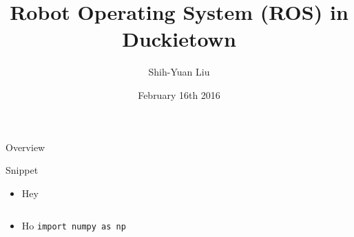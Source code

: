 \documentclass{beamer}
\author[Shih-Yuan Liu]{Shih-Yuan Liu}
\title[ROS in Duckietown]{Robot Operating System (ROS) in Duckietown}
\institute[Duckietown MIT]{Duckietown, MIT}
\date[Feb. 16th, 2016]{February 16th 2016}
\begin{document}

\begin{frame}[plain,label=titlepage,noframenumbering] %
  \titlepage
\end{frame}

\begin{frame}[label=overview]{Overview}
  \tableofcontents
\end{frame}

\begin{frame}{Snippet}
	\begin{itemize}[<+->]
		\item Hey
    \inputminted{python}{snippet/test.py}
		\item Ho \texttt{import numpy as np}
	\end{itemize}
\end{frame}
\end{document}
